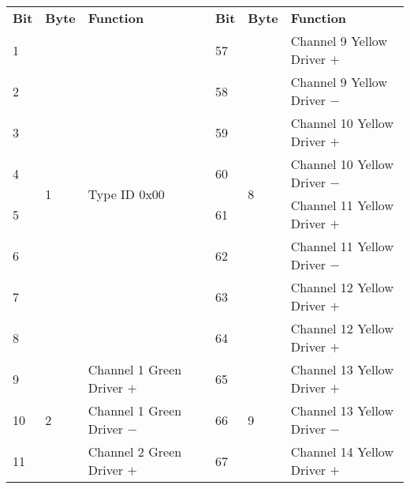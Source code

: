 \documentclass[]{article}
\begin{document}
\begin{table}[]
	\centering
	\scriptsize
	\begin{tabular}{@{}lllllll@{}}
		\cmidrule(r){1-3} \cmidrule(l){5-7}
		\textbf{Bit} & \textbf{Byte}      & \textbf{Function}             & \multirow{9}{*}{} & \textbf{Bit} & \textbf{Byte}       & \textbf{Function}            \\ \cmidrule(r){1-3} \cmidrule(l){5-7} 
		1            & \multirow{8}{*}{1} & \multirow{8}{*}{Type ID 0x00} &                   & 57           & \multirow{8}{*}{8}  & Channel 9 Yellow Driver $+$  \\
		2            &                    &                               &                   & 58           &                     & Channel 9 Yellow Driver $-$  \\
		3            &                    &                               &                   & 59           &                     & Channel 10 Yellow Driver $+$ \\
		4            &                    &                               &                   & 60           &                     & Channel 10 Yellow Driver $-$ \\
		5            &                    &                               &                   & 61           &                     & Channel 11 Yellow Driver $+$ \\
		6            &                    &                               &                   & 62           &                     & Channel 11 Yellow Driver $-$ \\
		7            &                    &                               &                   & 63           &                     & Channel 12 Yellow Driver $+$ \\
		8            &                    &                               &                   & 64           &                     & Channel 12 Yellow Driver $+$ \\ \cmidrule(r){1-3} \cmidrule(l){5-7} 
		9            & \multirow{8}{*}{2} & Channel 1 Green Driver $+$    &                   & 65           & \multirow{8}{*}{9}  & Channel 13 Yellow Driver $+$ \\
		10           &                    & Channel 1 Green Driver $-$    &                   & 66           &                     & Channel 13 Yellow Driver $-$ \\
		11           &                    & Channel 2 Green Driver $+$    &                   & 67           &                     & Channel 14 Yellow Driver $+$ \\

\end{tabular}
\end{table}
\end{document}
